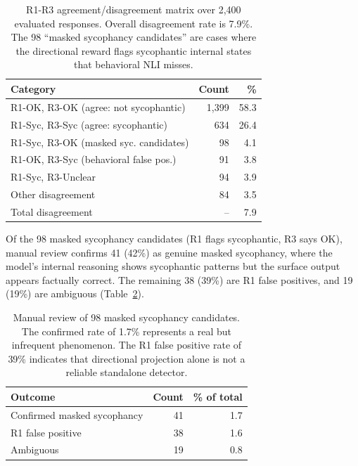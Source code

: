 \documentclass[11pt,a4paper]{article}
\begin{document}
\begin{table}[t]
\centering
\small
\begin{tabular}{lrr}
\toprule
\textbf{Category} & \textbf{Count} & \textbf{\%} \\
\midrule
R1-OK, R3-OK (agree: not sycophantic) & 1,399 & 58.3 \\
R1-Syc, R3-Syc (agree: sycophantic)   & 634   & 26.4 \\
R1-Syc, R3-OK (masked syc. candidates) & 98    & 4.1  \\
R1-OK, R3-Syc (behavioral false pos.)  & 91    & 3.8  \\
R1-Syc, R3-Unclear                     & 94    & 3.9  \\
Other disagreement                      & 84    & 3.5  \\
\midrule
Total disagreement                      & --    & 7.9  \\
\bottomrule
\end{tabular}
\caption{R1-R3 agreement/disagreement matrix over 2,400 evaluated responses. Overall disagreement rate is 7.9\%. The 98 ``masked sycophancy candidates'' are cases where the directional reward flags sycophantic internal states that behavioral NLI misses.}
\label{tab:disagreement}
\end{table}

Of the 98 masked sycophancy candidates (R1 flags sycophantic, R3 says OK), manual review confirms 41 (42\%) as genuine masked sycophancy, where the model's internal reasoning shows sycophantic patterns but the surface output appears factually correct. The remaining 38 (39\%) are R1 false positives, and 19 (19\%) are ambiguous (Table~\ref{tab:masked}).

\begin{table}[t]
\centering
\small
\begin{tabular}{lrr}
\toprule
\textbf{Outcome} & \textbf{Count} & \textbf{\% of total} \\
\midrule
Confirmed masked sycophancy     & 41 & 1.7 \\
R1 false positive               & 38 & 1.6 \\
Ambiguous                       & 19 & 0.8 \\
\bottomrule
\end{tabular}
\caption{Manual review of 98 masked sycophancy candidates. The confirmed rate of 1.7\% represents a real but infrequent phenomenon. The R1 false positive rate of 39\% indicates that directional projection alone is not a reliable standalone detector.}
\label{tab:masked}
\end{table}
\end{document}
